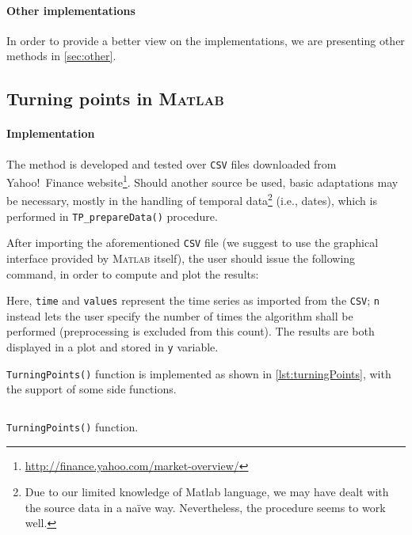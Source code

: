 \documentclass[a4paper]{article}
\newcommand{\matlab}{\textsc{Matlab}\xspace}
\newcommand{\csv}{\texttt{CSV}\xspace}
\begin{document}
\paragraph{Other implementations} In order to provide a better view on the implementations, we are presenting other methods in \cref{sec:other}.



\subsection{Turning points in \matlab}\label{sec:tp_matlab}

\paragraph{Implementation} The method is developed and tested over \csv files downloaded from Yahoo!\ Finance website\footnote{\url{http://finance.yahoo.com/market-overview/}}. Should another source be used, basic adaptations may be necessary, mostly in the handling of temporal data\footnote{Due to our limited knowledge of Matlab language, we may have dealt with the source data in a na{\"i}ve way. Nevertheless, the procedure seems to work well.} (i.e., dates), which is performed in \texttt{TP\_prepareData()} procedure. 

After importing the aforementioned \csv file (we suggest to use the graphical interface provided by \matlab itself), the user should issue the following command, in order to compute and plot the results: 

Here, \texttt{time} and \texttt{values} represent the time series as imported from the \csv; \texttt{n} instead lets the user specify the number of times the algorithm shall be performed (preprocessing is excluded from this count). The results are both displayed in a plot and stored in \texttt{y} variable.

\texttt{TurningPoints()} function is implemented as shown in \cref{lst:turningPoints}, with the support of some side functions.

\clearpage %

\begin{listing}%
 
\inputminted[firstline = 1, lastline = 50]{matlab}{../code/TurningPoints.m}

\caption{\texttt{TurningPoints()} function.}\label{lst:turningPoints}

\end{listing}
\end{document}
